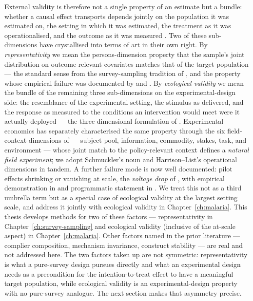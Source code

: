 External validity is therefore not a single property of an estimate but a bundle: whether a causal effect transports depends jointly on the population it was estimated on, the setting in which it was estimated, the treatment as it was operationalised, and the outcome as it was measured \citep{CampbellStanley1963}. Two of these sub-dimensions have crystallised into terms of art in their own right. By \emph{representativity} we mean the persons-dimension property that the sample's joint distribution on outcome-relevant covariates matches that of the target population --- the standard sense from the survey-sampling tradition of \citet{Neyman1934}, and the property whose empirical failure was documented by \citet{Allcott2015} and \citet{Bisbee2017}. By \emph{ecological validity} we mean the bundle of the remaining three sub-dimensions on the experimental-design side: the resemblance of the experimental setting, the stimulus as delivered, and the response as measured to the conditions an intervention would meet were it actually deployed --- the three-dimensional formulation of \citet{Schmuckler2001}. Experimental economics has separately characterised the same property through the six field-context dimensions of \citet{Harrison2004} --- subject pool, information, commodity, stakes, task, and environment --- whose joint match to the policy-relevant context defines a \emph{natural field experiment}; we adopt Schmuckler's noun and Harrison--List's operational dimensions in tandem. A further failure mode is now well documented: pilot effects shrinking or vanishing at scale, the \emph{voltage drop} of \citet{Al-Ubaydli2020}, with empirical demonstration in \citet{Bold2018} and programmatic statement in \citet{Muralidharan2017}. We treat this not as a third umbrella term but as a special case of ecological validity at the largest setting scale, and address it jointly with ecological validity in Chapter~\ref{ch:malaria}. This thesis develops methods for two of these factors --- representativity in Chapter~\ref{ch:survey-sampling} and ecological validity (inclusive of the at-scale aspect) in Chapter~\ref{ch:malaria}. Other factors named in the prior literature --- complier composition, mechanism invariance, construct stability --- are real and not addressed here. The two factors taken up are not symmetric: representativity is what a pure-survey design pursues directly and what an experimental design needs as a precondition for the intention-to-treat effect to have a meaningful target population, while ecological validity is an experimental-design property with no pure-survey analogue. The next section makes that asymmetry precise.

\printbibliography[heading=subbibliography, title={References for Chapter \thechapter}]
